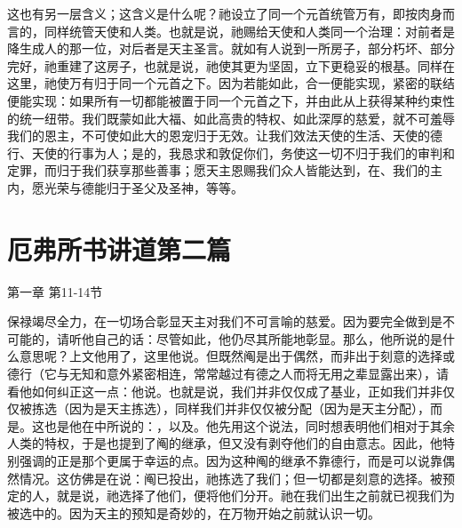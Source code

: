 这也有另一层含义；这含义是什么呢？祂设立了同一个元首统管万有，即按肉身而言的，同样统管天使和人类。也就是说，祂赐给天使和人类同一个治理：对前者是降生成人的那一位，对后者是天主圣言。就如有人说到一所房子，部分朽坏、部分完好，祂重建了这房子，也就是说，祂使其更为坚固，立下更稳妥的根基。同样在这里，祂使万有归于同一个元首之下。因为若能如此，合一便能实现，紧密的联结便能实现：如果所有一切都能被置于同一个元首之下，并由此从上获得某种约束性的统一纽带。我们既蒙如此大福、如此高贵的特权、如此深厚的慈爱，就不可羞辱我们的恩主，不可使如此大的恩宠归于无效。让我们效法天使的生活、天使的德行、天使的行事为人；是的，我恳求和敦促你们，务使这一切不归于我们的审判和定罪，而归于我们获享那些善事；愿天主恩赐我们众人皆能达到，在、我们的主内，愿光荣与德能归于圣父及圣神，等等。\par



\section{厄弗所书讲道第二篇}

第一章 第11-14节 \par

\par

保禄竭尽全力，在一切场合彰显天主对我们不可言喻的慈爱。因为要完全做到是不可能的，请听他自己的话：尽管如此，他仍尽其所能地彰显。那么，他所说的是什么意思呢？上文他用了，这里他说。但既然阄是出于偶然，而非出于刻意的选择或德行（它与无知和意外紧密相连，常常越过有德之人而将无用之辈显露出来），请看他如何纠正这一点：他说。也就是说，我们并非仅仅成了基业，正如我们并非仅仅被拣选（因为是天主拣选），同样我们并非仅仅被分配（因为是天主分配），而是。这也是他在中所说的：，以及。他先用这个说法，同时想表明他们相对于其余人类的特权，于是也提到了阄的继承，但又没有剥夺他们的自由意志。因此，他特别强调的正是那个更属于幸运的点。因为这种阄的继承不靠德行，而是可以说靠偶然情况。这仿佛是在说：阄已投出，祂拣选了我们；但一切都是刻意的选择。被预定的人，就是说，祂选择了他们，便将他们分开。祂在我们出生之前就已视我们为被选中的。因为天主的预知是奇妙的，在万物开始之前就认识一切。\par

